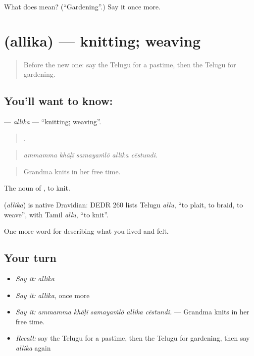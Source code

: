 \begin{tcolorbox}[breakable,colback=teal!4,colframe=teal!35!black,title={Before you move on}]
What does  mean? (\textquotedblleft{}Gardening\textquotedblright{}.) Say it once more.
\end{tcolorbox}
\section[\texorpdfstring{\te{అల్లిక} (allika)}{అల్లిక (allika)}]{ (allika) — knitting; weaving}

\label{lesson:TE-C536-allika}



\begin{quote}
Before the new one: say the Telugu for a pastime, then the Telugu for gardening.
\end{quote}

\subsection*{You'll want to know: }
\textbf{} — \emph{allika} — \textquotedblleft{}knitting; weaving\textquotedblright{}.

\begin{quote}
    .
\end{quote}

\begin{quote}
\emph{ammamma khāḷī samayaṁlō allika cēstundi.}
\end{quote}

\begin{quote}
Grandma knits in her free time.
\end{quote}

The noun of , to knit.

\begin{cousinweb}
\textbf{} (\emph{allika}) is native Dravidian: DEDR 260 lists Telugu \emph{allu}, \textquotedblleft{}to plait, to braid, to weave\textquotedblright{}, with Tamil \emph{allu}, \textquotedblleft{}to knit\textquotedblright{}.
\end{cousinweb}

\begin{grammarlens}[title={What you've built}]
One more word for describing what you lived and felt.
\end{grammarlens}

\subsection*{Your turn}
\begin{itemize}
\raggedright
  \item \emph{Say it:} \emph{allika}
  \item \emph{Say it:} \emph{allika}, once more
  \item \emph{Say it:} \emph{ammamma khāḷī samayaṁlō allika cēstundi.} — Grandma knits in her free time.
  \item \emph{Recall:} say the Telugu for a pastime, then the Telugu for gardening, then say \emph{allika} again
\end{itemize}

